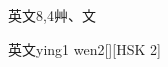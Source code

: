 \begin{entry}{英文}{8,4}{⾋、⽂}
  \begin{phonetics}{英文}{ying1 wen2}[][HSK 2]
  \end{phonetics}
\end{entry}
